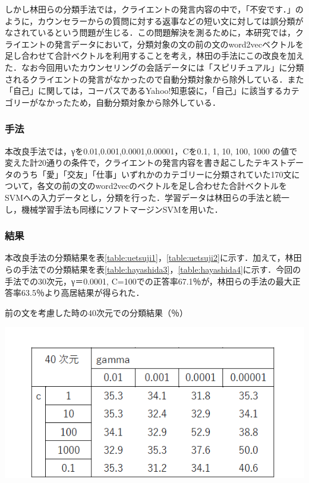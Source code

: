 \documentclass[shuuron]{kuee}
\begin{document}
しかし林田らの分類手法では，クライエントの発言内容の中で，「不安です．」のように，カウンセラーからの質問に対する返事などの短い文に対しては誤分類がなされているという問題が生じる．この問題解決を測るために，本研究では，クライエントの発言データにおいて，分類対象の文の前の文のword2vecベクトルを足し合わせて合計ベクトルを利用することを考え，林田の手法にこの改良を加えた．なお今回用いたカウンセリングの会話データには「スピリチュアル」に分類されるクライエントの発言がなかったので自動分類対象から除外している．また「自己」に関しては，コーパスであるYahoo!知恵袋に，「自己」に該当するカテゴリーがなかったため，自動分類対象から除外している．

\subsubsection{手法}
本改良手法では，γを0.01,0.001,0.0001,0.00001，Cを0.1, 1, 10, 100, 1000
の値で変えた計20通りの条件で，クライエントの発言内容を書き起こしたテキストデータのうち「愛」「交友」「仕事」いずれかのカテゴリーに分類されていた170文について，各文の前の文のword2vecのベクトルを足し合わせた合計ベクトルをSVMへの入力データとし，分類を行った．学習データは林田らの手法と統一し，機械学習手法も同様にソフトマージンSVMを用いた．%

\subsubsection{結果}
本改良手法の分類結果を表\ref{table:uetsuji1}，\ref{table:uetsuji2}に示す．加えて，林田らの手法での分類結果を表\ref{table:hayashida3}，\ref{table:hayashida4}に示す．今回の手法での30次元，γ＝0.0001, C=100での正答率67.1％が，林田らの手法の最大正答率63.5％より高居結果が得られた．

\begin{table}
  \caption{前の文を考慮した時の40次元での分類結果（％）}
  \label{table:uetsuji1}
  \begin{center}
    \includegraphics[width=\linewidth]{uetsuji1.png}
  \end{center}
\end{table}
\end{document}
